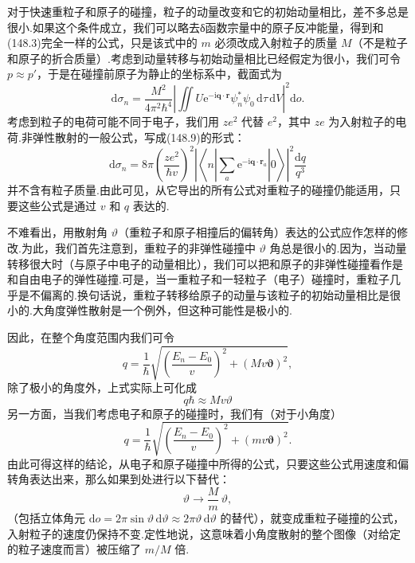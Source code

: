 对于快速重粒子和原子的碰撞，粒子的动量改变和它的初始动量相比，差不多总是很小.如果这个条件成立，我们可以略去δ函数宗量中的原子反冲能量，得到和(148.3)完全一样的公式，只是该式中的 $m$ 必须改成入射粒子的质量 $M$（不是粒子和原子的折合质量）.考虑到动量转移与初始动量相比已经假定为很小，我们可令 $p\approx p'$，于是在碰撞前原子为静止的坐标系中，截面式为
\begin{equation}
  \mathrm{d}\sigma_n=\frac{M^2}{4\pi^2\hbar^4}
  \left|\iint U\mathrm{e}^{-\mathrm{i}\boldsymbol{q}\cdot\boldsymbol{r}}\psi_n^{*}\psi_0\,\mathrm{d}\tau\,\mathrm{d}V\right|^2\mathrm{d}o.
\end{equation}
考虑到粒子的电荷可能不同于电子，我们用 $ze^2$ 代替 $e^2$，其中 $ze$ 为入射粒子的电荷.非弹性散射的一般公式，写成(148.9)的形式：
\begin{equation}
  \mathrm{d}\sigma_n=8\pi\left(\frac{ze^2}{\hbar v}\right)^2
  \left|\left\langle n\left|\sum_a\mathrm{e}^{-\mathrm{i}\boldsymbol{q}\cdot\boldsymbol{r}_a}\right|0\right\rangle\right|^2
  \frac{\mathrm{d}q}{q^3}
\end{equation}
并不含有粒子质量.由此可见，从它导出的所有公式对重粒子的碰撞仍能适用，只要这些公式是通过 $v$ 和 $q$ 表达的.

不难看出，用散射角 $\vartheta$（重粒子和原子相撞后的偏转角）表达的公式应作怎样的修改.为此，我们首先注意到，重粒子的非弹性碰撞中 $\vartheta$ 角总是很小的.因为，当动量转移很大时（与原子中电子的动量相比），我们可以把和原子的非弹性碰撞看作是和自由电子的弹性碰撞.可是，当一重粒子和一轻粒子（电子）碰撞时，重粒子几乎是不偏离的.换句话说，重粒子转移给原子的动量与该粒子的初始动量相比是很小的.大角度弹性散射是一个例外，但这种可能性是极小的.

因此，在整个角度范围内我们可令
\begin{equation}
  q=\frac{1}{\hbar}\sqrt{\left(\frac{E_n-E_0}{v}\right)^2+(Mv\boldsymbol{\vartheta})^2},
\end{equation}
除了极小的角度外，上式实际上可化成
\begin{equation}
  q\hbar\approx Mv\vartheta
\end{equation}
另一方面，当我们考虑电子和原子的碰撞时，我们有（对于小角度）
\begin{equation*}
  q=\frac{1}{\hbar}\sqrt{\left(\frac{E_n-E_0}{v}\right)^2+(mv\boldsymbol{\vartheta})^2}.
\end{equation*}
由此可得这样的结论，从电子和原子碰撞中所得的公式，只要这些公式用速度和偏转角表达出来，那么如果到处进行以下替代：
\begin{equation}
  \vartheta\to\frac{M}{m}\,\vartheta,
\end{equation}
（包括立体角元 $\mathrm{d}o=2\pi\sin\vartheta\,\mathrm{d}\vartheta\approx2\pi\vartheta\,\mathrm{d}\vartheta$ 的替代），就变成重粒子碰撞的公式，入射粒子的速度仍保持不变.定性地说，这意味着小角度散射的整个图像（对给定的粒子速度而言）被压缩了 $m/M$ 倍.

